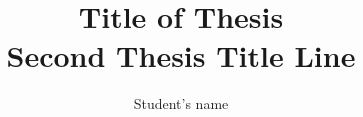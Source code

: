\documentclass{ucalgthes1}
\title{Title of Thesis \\ \bigskip Second Thesis Title Line }
\author{Student's name}
\begin{document}

\makethesistitle
{}     %
\setcounter{page}{1}

\newpage
{}
{}

\newpage
{}


\begin{singlespace}
\newpage
{}
\tableofcontents
\pagestyle{plain}
\newpage
{}
\pagestyle{plain}
\newpage
{}
\pagestyle{plain}
\clearpage
\clearpage          %
\end{singlespace}
\newpage
{}
\pagestyle{plain}
\clearpage






%
%
\def\newblock{\hskip .11em plus .33em minus .07em} %

\end{document}
